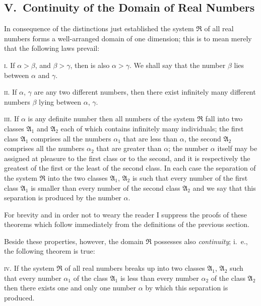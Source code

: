 \documentclass[polutonikogreek,english,twoside,openright]{article}
\begin{document}
\subsection*{V.\ Continuity of the Domain of Real Numbers}

In consequence of the distinctions just established the system
$\mathfrak{R}$ of all real
numbers forms a well-arranged domain of one dimension; this is to mean
merely that the following laws prevail:

\textsc{i.} If $\alpha>\beta$, and $\beta>\gamma$, then is also
$\alpha>\gamma$. We shall say that the number $\beta$ lies between
$\alpha$ and $\gamma$.

\textsc{ii.} If $\alpha$, $\gamma$ are any two different numbers, then
there exist infinitely many different numbers $\beta$ lying between
$\alpha$, $\gamma$.

\textsc{iii.} If $\alpha$ is any definite number then all numbers of
the system $\mathfrak{R}$ fall into two classes $\mathfrak{A}_1$ and
$\mathfrak{A}_2$ each of which contains infinitely many individuals;
the first class $\mathfrak{A}_1$ comprises all the numbers $\alpha_1$
that are less than $\alpha$, the second $\mathfrak{A}_2$ comprises all
the numbers $\alpha_2$ that are greater than $\alpha$; the number
$\alpha$ itself may be assigned at pleasure to the first class or to
the second, and it is respectively the greatest of the first or the
least of the second class. In each case the separation of the system
$\mathfrak{R}$ into the two classes $\mathfrak{A}_1$, $\mathfrak{A}_2$
is such that every number of the first class $\mathfrak{A}_1$ is smaller
than every number of the second class $\mathfrak{A}_2$ and we say that
this separation is produced by the number $\alpha$.

For brevity and in order not to weary the reader I suppress the proofs
of these theorems which follow immediately from the definitions of the
previous section.

Beside these properties, however, the domain $\mathfrak{R}$ possesses
also \textit{continuity}; i.~e., the following theorem is true:

\textsc{iv.} \label{EISViv}If the system $\mathfrak{R}$ of all real
numbers breaks up into two classes $\mathfrak{A}_1$, $\mathfrak{A}_2$
such that every number $\alpha_1$ of the class $\mathfrak{A}_1$ is
less than every number $\alpha_2$ of the class $\mathfrak{A}_2$ then
there exists one and only one number $\alpha$ by which this separation
is produced.
\end{document}
